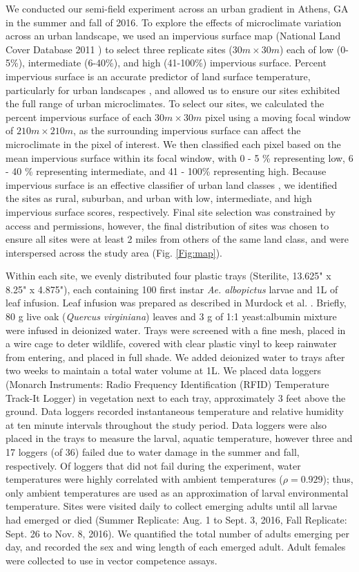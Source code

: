 \documentclass[12pt]{article}
\begin{document}
We conducted our semi-field experiment across an urban gradient in Athens, GA in the summer and fall of 2016. To explore the effects of microclimate variation across an urban landscape, we used an impervious surface map (National Land Cover Database 2011 \cite{xian2011}) to select three replicate sites ($30m \times 30m$) each of low (0-5\%), intermediate (6-40\%), and high (41-100\%) impervious surface.
Percent impervious surface is an accurate predictor of land surface temperature, particularly for urban landscapes \cite{yuan2007}, and allowed us to ensure our sites exhibited the full range of urban microclimates.
To select our sites, we calculated the percent impervious surface of each $30m \times 30m$ pixel using a moving focal window of $210m \times 210m$, as the surrounding impervious surface can affect the microclimate in the pixel of interest.
We then classified each pixel based on the mean impervious surface within its focal window, with 0 - 5 \% representing low, 6 - 40 \% representing intermediate, and 41 - 100\% representing high.
Because impervious surface is an effective classifier of urban land classes \cite{lu2006}, we identified the sites as rural, suburban, and urban with low, intermediate, and high impervious surface scores, respectively.
Final site selection was constrained by access and permissions, however, the final distribution of sites was chosen to ensure all sites were at least 2 miles from others of the same land class, and were interspersed across the study area (Fig. \ref{Fig:map}).

Within each site, we evenly distributed four plastic trays (Sterilite, 13.625" x 8.25" x 4.875"), each containing 100 first instar \textit{Ae. albopictus} larvae and 1L of leaf infusion.
Leaf infusion was prepared as described in Murdock et al. \cite{murdock2017}.
Briefly, 80 g live oak (\textit{Quercus virginiana}) leaves and 3 g of 1:1 yeast:albumin mixture were infused in deionized water.
Trays were screened with a fine mesh, placed in a wire cage to deter wildlife, covered with clear plastic vinyl to keep rainwater from entering, and placed in full shade.
We added deionized water to trays after two weeks to maintain a total water volume at 1L.
We placed data loggers (Monarch Instruments: Radio Frequency Identification (RFID) Temperature Track-It Logger) in vegetation next to each tray, approximately 3 feet above the ground.
Data loggers recorded instantaneous temperature and relative humidity at ten minute intervals throughout the study period.
Data loggers were also placed in the trays to measure the larval, aquatic temperature, however three and 17 loggers (of 36) failed due to water damage in the summer and fall, respectively.
Of loggers that did not fail during the experiment, water temperatures were highly correlated with ambient temperatures ($\rho=0.929$); thus, only ambient temperatures are used as an approximation of larval environmental temperature.
Sites were visited daily to collect emerging adults until all larvae had emerged or died (Summer Replicate: Aug. 1 to Sept. 3, 2016, Fall Replicate: Sept. 26 to Nov. 8, 2016).
We quantified the total number of adults emerging per day, and recorded the sex and wing length of each emerged adult.
Adult females were collected to use in vector competence assays.
\end{document}
